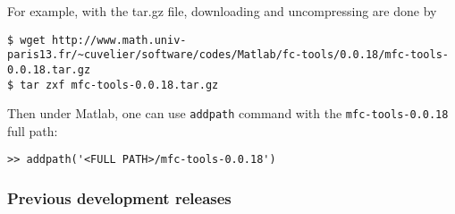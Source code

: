 For example, with the tar.gz file, downloading and uncompressing are done by 
\begin{verbatim}
$ wget http://www.math.univ-paris13.fr/~cuvelier/software/codes/Matlab/fc-tools/0.0.18/mfc-tools-0.0.18.tar.gz
$ tar zxf mfc-tools-0.0.18.tar.gz
\end{verbatim}
Then under Matlab, one can use \texttt{addpath} command with the \texttt{mfc-tools-0.0.18} full path:
\begin{verbatim}
>> addpath('<FULL PATH>/mfc-tools-0.0.18')
\end{verbatim}
 
\subsubsection{Previous development releases}

